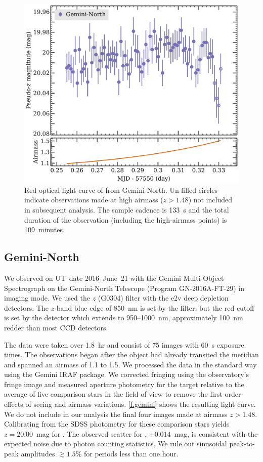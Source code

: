 \documentclass[twocolumn, times]{aastex6}
\begin{document}
\begin{figure}[tbp]
  \includegraphics[width=\linewidth]{gemini}
  \caption{Red optical light curve of  from Gemini-North. Un-filled
    circles indicate observations made at high airmass ($z > 1.48$) not
    included in subsequent analysis. The sample cadence is 133~s and the total
    duration of the observation (including the high-airmass points) is
    109~minutes.}
  \label{f.gemini}
\end{figure}

\subsection{Gemini-North}

We observed  on UT~date 2016~June~21 with the Gemini Multi-Object
Spectrograph \citep[GMOS-N;][]{hjas+04} on the Gemini-North Telescope (Program
GN-2016A-FT-29) in imaging mode. We used the $z$ (G0304) filter with the e2v
deep depletion detectors. The $z$-band blue edge of 850~nm is set by the
filter, but the red cutoff is set by the detector which extends to
950--1000~nm, approximately 100~nm redder than most CCD detectors.

The data were taken over 1.8~hr and consist of 75 images with 60~s exposure
times. The observations began after the object had already transited the
meridian and spanned an airmass of 1.1 to 1.5. We processed the data in the
standard way using the Gemini IRAF package. We corrected fringing using the
observatory's fringe image and measured aperture photometry for the target
relative to the average of five comparison stars in the field of view to
remove the first-order effects of seeing and airmass variations.
\autoref{f.gemini} shows the resulting light curve. We do not include in our
analysis the final four images made at airmass $z > 1.48$. Calibrating from
the SDSS photometry for these comparison stars yields $z = 20.00$~mag for
. The observed scatter for , ${\pm}0.014$~mag, is
consistent with the expected noise due to photon counting statistics. We rule
out sinusoidal peak-to-peak amplitudes ${\gtrsim}1.5$\% for periods less than
one hour.
\end{document}
